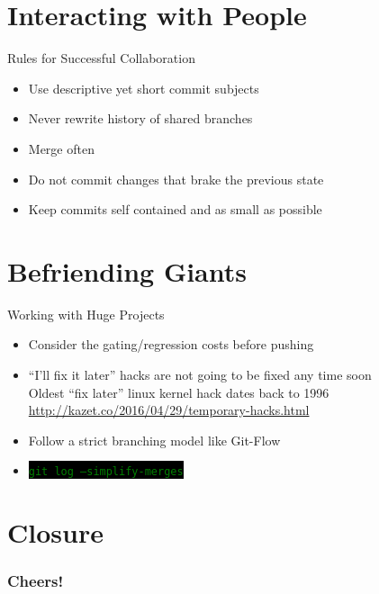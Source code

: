 \documentclass[
14pt,
aspectratio=169,
usenames,
dvipsnames,
x11names]{beamer}
\newcommand{\code}[1]{{\small\colorbox{black}{\textcolor{green}{\texttt{#1}}}}}
\begin{document}
\section{Interacting with People}

\begin{frame}{Rules for Successful Collaboration}
  \begin{itemize}[<+->] \setlength{\itemsep}{\fill}
  \item Use \alert{descriptive yet short} commit subjects
  \item \alert{Never} rewrite history of shared branches
  \item \alert{Merge} often
  \item \alert{Do not} commit changes that brake the previous state
  \item Keep commits \alert{self contained} and as small as possible
  \end{itemize}
\end{frame}

\section{Befriending Giants}

\begin{frame}{Working with Huge Projects}
  \begin{itemize}[<+->] \setlength{\itemsep}{\fill}
  \item Consider the \alert{gating/regression costs} before pushing
  \item ``I'll fix it later'' hacks are not going to be fixed any time soon\\[1ex]
    Oldest \alert{``fix later''} linux kernel hack dates back to \alert{1996} \url{http://kazet.co/2016/04/29/temporary-hacks.html}
  \item Follow a strict branching model like \alert{Git-Flow}
  \item \code{git log --simplify-merges}
  \end{itemize}
\end{frame}




\section{Closure}
{
\begin{frame}[noframenumbering]
 \frametitle{\textbf{Cheers!}}
 \centering
 \titlepage
\end{frame}
}

\end{document}
